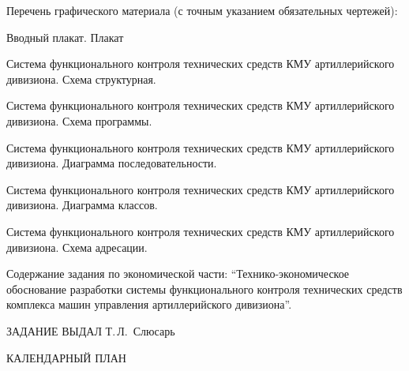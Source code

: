 {\begin{flushleft}
\begin{legal}
        \item Перечень графического материала (с точным указанием обязательных чертежей):
            \begin{legal}
            \item Вводный плакат. Плакат
            \item Система функционального контроля технических средств КМУ артиллерийского дивизиона. Схема структурная.
            \item Система функционального контроля технических средств КМУ артиллерийского дивизиона. Схема программы.
            \item Система функционального контроля технических средств КМУ артиллерийского дивизиона. Диаграмма последовательности.
            \item Система функционального контроля технических средств КМУ артиллерийского дивизиона. Диаграмма классов.
            \item Система функционального контроля технических средств КМУ артиллерийского дивизиона. Схема адресации.
            \end{legal}

            \vspace{1em}

        \item Содержание задания по экономической части: ``Технико-экономическое обоснование разработки системы функционального контроля технических средств комплекса машин управления артиллерийского дивизиона''.

        \end{legal}

    \end{flushleft}

    ЗАДАНИЕ ВЫДАЛ \hfill{} Т.\,Л.~Слюсарь \\

    \begin{center}
        КАЛЕНДАРНЫЙ ПЛАН
    \end{center}

}
